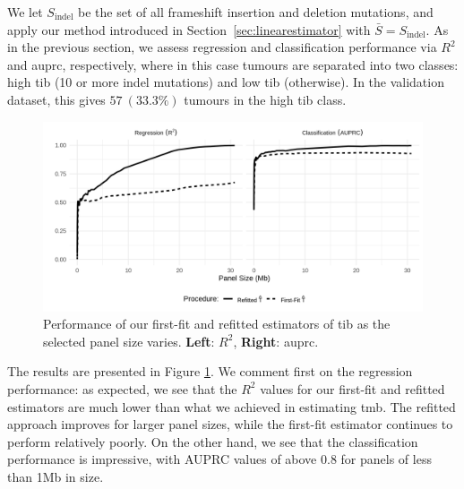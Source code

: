 \documentclass[../thesis.tex]{subfiles}
\begin{document}
We let $S_{\text{indel}}$ be the set of all frameshift insertion and deletion mutations, and apply our method introduced in Section~\ref{sec:linearestimator} with $\bar{S} = S_{\text{indel}}$. As in the previous section, we assess regression and classification performance via $R^2$ and \gls{auprc}, respectively, where in this case tumours are separated into two classes: high \gls{tib} (10 or more indel mutations) and low \gls{tib} (otherwise). In the validation dataset, this gives $57 \ (33.3 \% )$ tumours in the high \gls{tib} class. 

\begin{figure}[htbp]
\centering
\includegraphics[width=6in]{figures/chapter3/fig9.png}
\vspace*{-5mm}
\caption{Performance of our first-fit and refitted estimators of \gls{tib} as the selected panel size varies. \textbf{Left}: $R^2$, \textbf{Right}: \gls{auprc}. \label{fig:indelstatsplot}}
\vspace*{-2mm}
\end{figure}

The results are presented in Figure \ref{fig:indelstatsplot}. We comment first on the regression performance: as expected, we see that the $R^2$ values for our first-fit and refitted estimators are much lower than what we achieved in estimating \gls{tmb}. The refitted approach improves for larger panel sizes, while the first-fit estimator continues to perform relatively poorly. On the other hand, we see that the classification performance is impressive, with AUPRC values of above 0.8 for panels of less than 1Mb in size.
\end{document}
